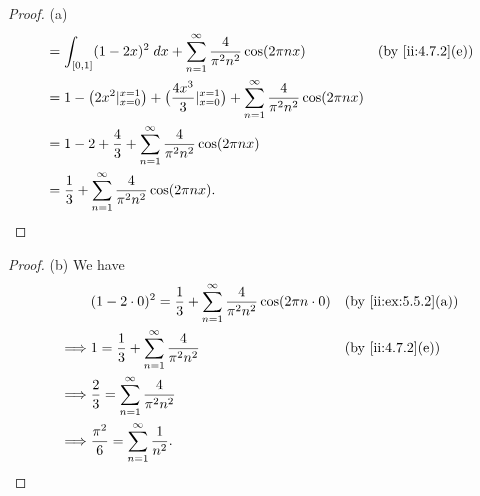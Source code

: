 \begin{proof}{(a)}
\begin{align*}
     & = \int_{[0, 1]} (1 - 2x)^2 \; dx + \sum_{n = 1}^\infty \dfrac{4}{\pi^2 n^2} \cos(2 \pi n x)                                                   &  & \by{ii:4.7.2}[e]              \\
     & = 1 - \big(2x^2|_{x = 0}^{x = 1}\big) + \big(\dfrac{4x^3}{3}|_{x = 0}^{x = 1}\big) + \sum_{n = 1}^\infty \dfrac{4}{\pi^2 n^2} \cos(2 \pi n x)                                    \\
     & = 1 - 2 + \dfrac{4}{3} + \sum_{n = 1}^\infty \dfrac{4}{\pi^2 n^2} \cos(2 \pi n x)                                                                                                \\
     & = \dfrac{1}{3} + \sum_{n = 1}^\infty \dfrac{4}{\pi^2 n^2} \cos(2 \pi n x).
  \end{align*}
\end{proof}

\begin{proof}{(b)}
  We have
  \begin{align*}
             & (1 - 2 \cdot 0)^2 = \dfrac{1}{3} + \sum_{n = 1}^\infty \dfrac{4}{\pi^2 n^2} \cos(2 \pi n \cdot 0) &  & \by{ii:ex:5.5.2}[a] \\
    \implies & 1 = \dfrac{1}{3} + \sum_{n = 1}^\infty \dfrac{4}{\pi^2 n^2}                                       &  & \by{ii:4.7.2}[e]    \\
    \implies & \dfrac{2}{3} = \sum_{n = 1}^\infty \dfrac{4}{\pi^2 n^2}                                                                    \\
    \implies & \dfrac{\pi^2}{6} = \sum_{n = 1}^\infty \dfrac{1}{n^2}.
  \end{align*}
\end{proof}

